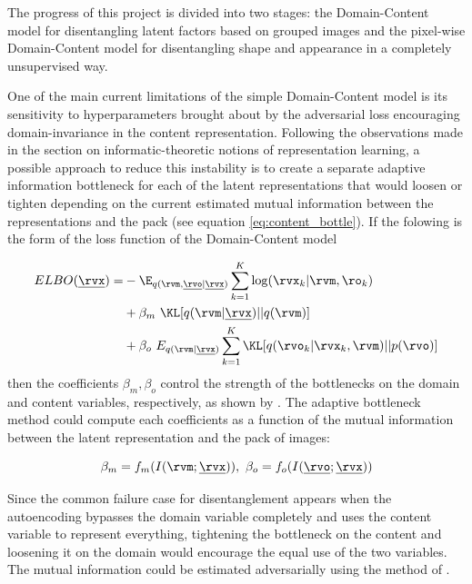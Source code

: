 \documentclass[withindex,glossary,firstyr,times]{cam-thesis}
\begin{document}
The progress of this project is divided into two stages: the Domain-Content model for disentangling latent factors based on grouped images and the pixel-wise Domain-Content model for disentangling shape and appearance in a completely unsupervised way.

One of the main current limitations of the simple Domain-Content model is its sensitivity to hyperparameters brought about by the adversarial loss encouraging domain-invariance in the content representation. Following the observations made in the section on informatic-theoretic notions of representation learning, a possible approach to reduce this instability is to create a separate adaptive information bottleneck \cite{luo2019significance} for each of the latent representations that would loosen or tighten depending on the current estimated mutual information between the representations and the pack (see equation \ref{eq:content_bottle}). If the folowing is the form of the loss function of the Domain-Content model

\begin{align}
    ELBO(\underline{\rvx}) = &- \E_{q(\rvm, \underline{\rvo} | \underline{\rvx})} \sum_{k=1}^K \log(\rvx_k | \rvm, \ro_k) \\ &+ \beta_m ~\KL[q(\rvm | \underline{\rvx}) || q(\rvm)] \\ &+ \beta_o ~ E_{q(\rvm | \underline{\rvx})} \sum_{k=1}^K \KL[q(\rvo_k | \rvx_k, \rvm) || p(\rvo)]
\end{align}
then the coefficients $\beta_m, \beta_o$ control the strength of the bottlenecks on the domain and content variables, respectively, as shown by \citet{burgess2018understanding, alemi2018fixing}. The adaptive bottleneck method could compute each coefficients as a function of the mutual information between the latent representation and the pack of images: 

\begin{equation}
\beta_m = f_m (I(\rvm; \underline{\rvx})), ~ \beta_o = f_o (I(\underline{\rvo}; \underline{\rvx}))
\end{equation}

Since the common failure case for disentanglement appears when the autoencoding bypasses the domain variable completely and uses the content variable to represent everything, tightening the bottleneck on the content and loosening it on the domain would encourage the equal use of the two variables. The mutual information could be estimated adversarially using the method of \citet{belghazi2018mutual}.
\end{document}

